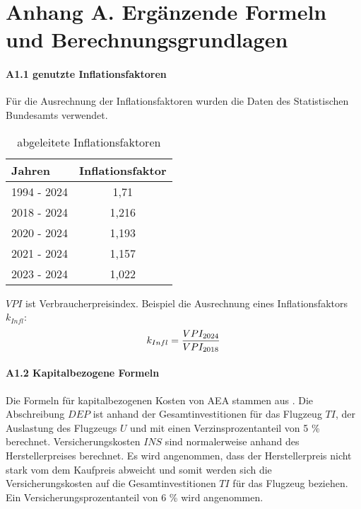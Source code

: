 \chapter{Anhang A. Ergänzende Formeln und Berechnungsgrundlagen}
\subsubsection{A1.1 genutzte Inflationsfaktoren}
Für die Ausrechnung der Inflationsfaktoren wurden die Daten des Statistischen Bundesamts verwendet. 
\begin{table}[h]
	\begin{center}
    \caption{abgeleitete Inflationsfaktoren}
	\label{Inflationsfaktoren}
	\begin{tabular}{|l|c|}
		\hline
		Jahren & \textbf{Inflationsfaktor} \\ \hline
		1994 - 2024 & 1,71 \\ \hline
		2018 - 2024 & 1,216 \\ \hline
		2020 - 2024 & 1,193 \\ \hline
        2021 - 2024 & 1,157 \\ \hline
        2023 - 2024 & 1,022 \\ \hline
	\end{tabular}
    \end{center}
\end{table}

$VPI$ ist Verbraucherpreisindex. Beispiel die Ausrechnung eines Inflationsfaktors $k_{Infl}$:
\begin{equation}
	{k_{Infl}} = \frac{VPI_{2024}}{VPI_{2018}} \\
	\label{inflation}
 \end{equation}

\subsubsection{A1.2 Kapitalbezogene Formeln}
Die Formeln für kapitalbezogenen Kosten von AEA stammen aus \cite{minwoo2019analysis}.
Die Abschreibung $DEP$ ist anhand der Gesamtinvestitionen für das Flugzeug $TI$, der Auslastung des Flugzeugs $U$
und mit einen Verzinsprozentanteil von 5 \% \cite{scholz_design_evaluation_doc} berechnet.
Versicherungskosten $INS$ sind normalerweise anhand des Herstellerpreises berechnet. 
Es wird angenommen, dass der Herstellerpreis nicht stark
vom dem Kaufpreis abweicht und somit werden sich die Versicherungskosten auf die Gesamtinvestitionen $TI$
für das Flugzeug beziehen. Ein Versicherungsprozentanteil von 6 \% wird angenommen.

